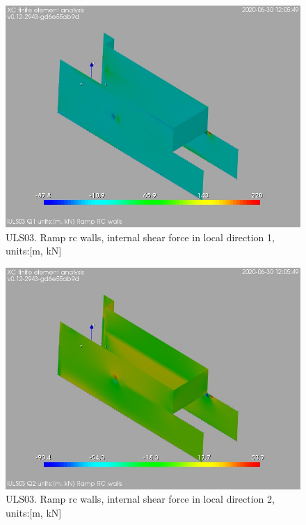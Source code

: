 \begin{figure}
\begin{center}
\includegraphics[width=\linewidth]{ramp_wall/resLC/text/graphics/resSimplLC/lULS03wallsQ1}
\caption{ULS03. Ramp rc walls, internal shear force in local direction 1, units:[m, kN]}
\end{center}
\end{figure}
\begin{figure}
\begin{center}
\includegraphics[width=\linewidth]{ramp_wall/resLC/text/graphics/resSimplLC/lULS03wallsQ2}
\caption{ULS03. Ramp rc walls, internal shear force in local direction 2, units:[m, kN]}
\end{center}
\end{figure}

